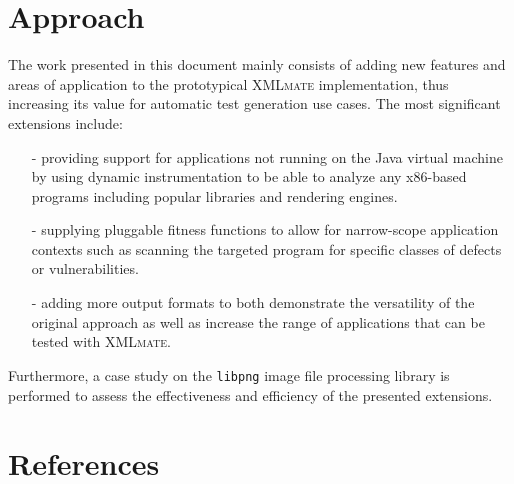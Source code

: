 \documentclass[a4paper,parskip=half,twoside=semi]{scrartcl}
\newcommand{\java}{Java\xspace}
\newcommand{\xmlmate}{\textsc{XMLmate}\xspace}
\newcommand{\libpng}{\texttt{libpng}\xspace}
\begin{document}

\newpage

\newpage

\cleardoublepage

\newpage
{} %
\setcounter{page}{6} %
\tableofcontents
\newpage

\cleardoublepage

\cleardoublepage
\section{Approach}
\label{sec:approach}
The work presented in this document mainly consists of adding new features and areas of application to the
prototypical \xmlmate implementation, thus increasing its value for automatic test generation use cases. The
most significant extensions include: 
\begin{itemize}
\item[-]providing support for applications not running on the \java virtual machine by using dynamic 
instrumentation to be able to analyze any x86-based programs including popular libraries and rendering
engines.
\item[-]supplying pluggable fitness functions to allow for narrow-scope application contexts such
as scanning the targeted program for specific classes of defects or vulnerabilities.
\item[-]adding more output formats to both demonstrate the versatility of the original approach as well as
increase the range of applications that can be tested with \xmlmate.
\end{itemize}

Furthermore, a case study on the \libpng image file processing library is performed to assess the
effectiveness and efficiency of the presented extensions.





\cleardoublepage

\cleardoublepage


\cleardoublepage
\section*{References}
\renewcommand\refname{}


\end{document}
